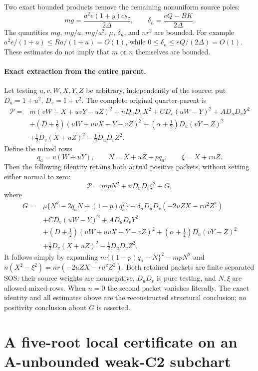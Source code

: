 Two exact bounded products remove the remaining nonuniform source
poles:
\[
 mg=\frac{a^2e(1+y)c s_c}{2\Delta},\qquad
 \delta_n=\frac{eQ-BK}{2\Delta}.                       \tag{RER7}
\]
The quantities $mg$, $mg/a$, $mg/a^2$, $\mu$, $\delta_n$, and
$nr^2$ are bounded.  For example
$a^2e/(1+a)\leq R a/(1+a)=O(1)$, while
$0\leq\delta_n\leq eQ/(2\Delta)=O(1)$.
These estimates do not imply that $m$ or $n$ themselves are bounded.

\paragraph{Exact extraction from the entire parent.}
Let testing $u,v,W,X,Y,Z$ be arbitrary, independently of the source;
put $D_u=1+u^2$, $D_v=1+v^2$.  The complete original quarter-parent is
\begin{align*}
 \mathcal P={}&m(vW-X+uvY-uZ)^2+nD_uD_vX^2
     +CD_v(uW-Y)^2+AD_uD_vY^2\\
 &+(D+\tfrac12)(uW+uvX-Y-vZ)^2
     +(\alpha+\tfrac12)D_u(vY-Z)^2\\
 &+\tfrac12D_v(X+uZ)^2-\tfrac12D_uD_vZ^2.
\end{align*}
Define the mixed rows
\[
 q_a=v(W+uY),\qquad N=X+uZ-pq_a,\qquad \xi=X+ruZ.
\]
Then the following identity retains both actual positive packets,
without setting either normal to zero:
\[
 \mathcal P=mpN^2+nD_uD_v\xi^2+G,                       \tag{RER8}
\]
where
\begin{align*}
 G={}&\mu\{N^2-2q_aN+(1-p)q_a^2\}
        +\delta_nD_uD_v(-2uZX-ru^2Z^2)\\
 &+CD_v(uW-Y)^2+AD_uD_vY^2\\
 &+(D+\tfrac12)(uW+uvX-Y-vZ)^2
        +(\alpha+\tfrac12)D_u(vY-Z)^2\\
 &+\tfrac12D_v(X+uZ)^2-\tfrac12D_uD_vZ^2.
\end{align*}
It follows simply by expanding
$m\{(1-p)q_a-N\}^2-mpN^2$ and
$n(X^2-\xi^2)=nr(-2uZX-ru^2Z^2)$.
Both retained packets are finite separated SOS: their source weights
are nonnegative, $D_uD_v$ is pure testing, and $N,\xi$ are allowed
mixed rows.  When $n=0$ the second packet vanishes literally.
The exact identity and all estimates above are the reconstructed
structural conclusion; no positivity conclusion about $G$ is asserted.


\section{\texorpdfstring{A five-root local certificate on an A-unbounded weak-C2 subchart}{A five-root local certificate on an A-unbounded weak-C2 subchart}}
\label{component:p9ec3d6bbd717}

